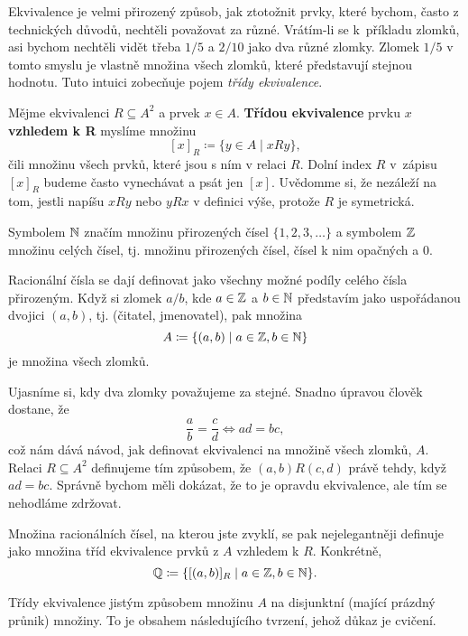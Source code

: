 Ekvivalence je velmi přirozený způsob, jak ztotožnit prvky, které bychom, často
z technických důvodů, nechtěli považovat za různé. Vrátím-li se k~příkladu
zlomků, asi bychom nechtěli vidět třeba $1 / 5$ a $2 / 10$ jako dva různé
zlomky. Zlomek $1 / 5$ v tomto smyslu je vlastně množina všech zlomků, které
představují stejnou hodnotu. Tuto intuici zobecňuje pojem \emph{třídy
ekvivalence}.

\begin{definition}
 \label{def:trida-ekvivalence}
 Mějme ekvivalenci $R \subseteq A^2$ a prvek $x \in A$. \textbf{Třídou
 ekvivalence} prvku $x$ \textbf{vzhledem k R} myslíme množinu
 \[
  [x]_{R} \coloneqq \{y \in A \mid xRy\},
 \]
 čili množinu všech prvků, které jsou s ním v relaci $R$. Dolní index $R$
 v~zápisu $[x]_R$ budeme často vynechávat a psát jen $[x]$. Uvědomme si, že
 nezáleží na tom, jestli napíšu $xRy$ nebo $yRx$ v definici výše, protože $R$ je
 symetrická.
\end{definition}

\begin{example}
 Symbolem $\mathbb{N}$ značím množinu přirozených čísel $\{1,2,3,\ldots\}$ a symbolem
 $\mathbb{Z}$ množinu celých čísel, tj. množinu přirozených čísel, čísel k nim opačných
 a $0$.

 Racionální čísla se dají definovat jako všechny možné podíly celého čísla
 přirozeným. Když si zlomek $a / b$, kde  $a \in \mathbb{Z}$ a $b \in \mathbb{N}$ představím
 jako uspořádanou dvojici $(a,b)$, tj. (čitatel, jmenovatel), pak množina
 \[
  A \coloneqq \{(a,b) \mid a \in \mathbb{Z}, b \in \mathbb{N}\}
 \]
 je množina všech zlomků.

 Ujasníme si, kdy dva zlomky považujeme za stejné. Snadno úpravou člověk
 dostane, že
 \[
  \frac{a}{b} = \frac{c}{d} \iff ad = bc,
 \]
 což nám dává návod, jak definovat ekvivalenci na množině všech zlom\-ků, $A$.
 Relaci $R \subseteq A^2$ definujeme tím způsobem, že $(a,b)R(c,d)$ právě tehdy,
 když $ad = bc$. Správně bychom měli dokázat, že to je opravdu ekvivalence, ale
 tím se nehodláme zdržovat.

 Množina racionálních čísel, na kterou jste zvyklí, se pak nejelegantněji
 definuje jako množina tříd ekvivalence prvků z $A$ vzhledem k $R$. Konkrétně,
 \[
  \mathbb{Q} \coloneqq \{[(a, b)]_R \mid a \in \mathbb{Z},b \in \mathbb{N}\}.
 \]
\end{example}

Třídy ekvivalence jistým způsobem  množinu $A$ na disjunktní
(mající prázdný průnik) množiny. To je obsahem následujícího tvrzení, jehož
důkaz je cvičení.

